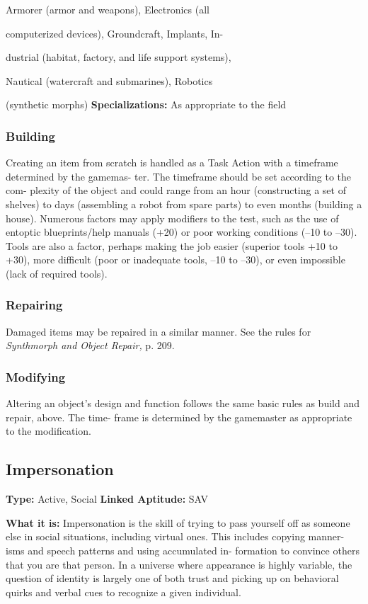 Armorer (armor and weapons), Electronics (all 

computerized devices), Groundcraft, Implants, In-

dustrial (habitat, factory, and life support systems), 

Nautical (watercraft and submarines), Robotics 

(synthetic morphs)
\textbf{Specializations:} As appropriate to the field

\subsubsection{Building}

Creating an item from scratch is handled as a Task 
Action with a timeframe determined by the gamemas-
ter. The timeframe should be set according to the com-
plexity of the object and could range from an hour 
(constructing a set of shelves) to days (assembling a 
robot from spare parts) to even months (building a 
house). Numerous factors may apply modifiers  to 
the test, such as the use of entoptic blueprints/help 
manuals (+20) or poor working conditions (–10 to 
–30). Tools are also a factor, perhaps making the job 
easier (superior tools +10 to +30), more difficult (poor 
or inadequate tools, –10 to –30), or even impossible 
(lack of required tools).

\subsubsection{Repairing}

Damaged items may be repaired in a similar manner. See 
the rules for \textit{Synthmorph and Object Repair,} p. 209.

\subsubsection{Modifying}

Altering an object's design and function follows the 
same basic rules as build and repair, above. The time-
frame is determined by the gamemaster as appropriate 
to the modification.

\subsection{Impersonation}

\textbf{Type:} Active, Social
\textbf{Linked Aptitude:} SAV

\textbf{What it is:} Impersonation is the skill of trying to 
pass yourself off as someone else in social situations, 
including virtual ones. This includes copying manner-
isms and speech patterns and using accumulated in-
formation to convince others that you are that person. 
In a universe where appearance is highly variable, the 
question of identity is largely one of both trust and 
picking up on behavioral quirks and verbal cues to 
recognize a given individual.

